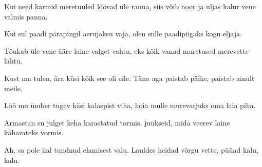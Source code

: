 Kui need karmid meretuuled 
l\"o\"ovad \"ule ranna,
siis v\~oib noor ja uljas kalur
vene valmis panna.

Kui sul paadi p\"arapingil
aerujaksu vaja,
olen sulle paadipiigaks
kogu eljaja.

T\~oukab \"ule vene \"a\"are
laine valget vahtu,
eks k\~oik vanad muretused
merevette lahtu.

Kust ma tulen, \"ara k\"usi
k\~oik see oli eile.
T\"ana aga paistab p\"aike,
paistab ainult meile.

L\"o\"o mu \"umber tugev k\"asi
kalaspist viha,
hoia mulle murevarjuks
oma laia piha.

Armastan su julget keha
karastatud tormis,
juukseid, mida veerev laine
k\"aharateks vormis.

\clearpage Ah, sa pole iial tundnud
elamisest valu.
Lauldes heidad v\~orgu vette,
p\"u\"uad kalu, kalu.